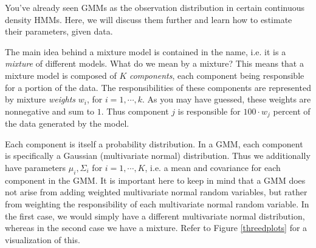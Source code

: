 

You've already seen GMMs as the observation distribution in certain continuous density HMMs. Here, we will discuss them further and learn how to estimate their parameters, given data.

The main idea behind a mixture model is contained in the name, i.e. it is a \emph{mixture} of different models. What do we mean by a mixture? This means that a mixture model is composed of $K$ \emph{components}, each component being responsible for a portion of the data. The responsibilities of these components are represented by mixture \emph{weights} $w_{i}$, for $i = 1, \cdots, k$. As you may have guessed, these weights are nonnegative and sum to $1$. Thus component $j$ is responsible for $100\cdot w_{j}$ percent of the data generated by the model.

Each component is itself a probability distribution. In a GMM, each component is specifically a Gaussian (multivariate normal) distribution. Thus we additionally have parameters $\mu_{i}, \Sigma_{i}$ for $i = 1, \cdots, K$, i.e. a mean and covariance for each component in the GMM. It is important here to keep in mind that a GMM does not arise from adding weighted multivariate normal random variables, but rather from weighting the responsibility of each multivariate normal random variable. In the first case, we would simply have a different multivariate normal distribution, whereas in the second case we have a mixture. Refer to Figure \ref{threedplots} for a visualization of this.

